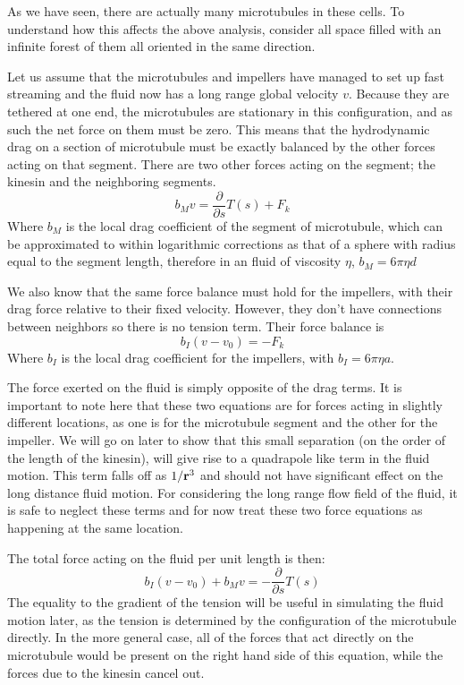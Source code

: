 \documentclass[11pt]{ucthesis}
\def\br{{\bf r}}
\begin{document}
As we have seen, there are actually many microtubules in these cells. To understand how this
affects the above analysis, consider all space filled with an infinite forest of them all oriented
in the same direction. 

Let us assume that the microtubules and impellers have managed to set up fast streaming and the fluid now has a long range global velocity $v$.
Because they are tethered at one end, the microtubules are stationary in this configuration, and as such the net force on them must be zero. 
This means that the hydrodynamic drag on a section of microtubule must be exactly balanced by the other forces acting on that segment.
There are two other forces acting on the segment; the kinesin and the neighboring segments.
\begin{equation}
\label{eq:mfnetMforce}
b_M v = \frac{\partial}{\partial s}T(s) + F_k
\end{equation}
Where $b_M$ is the local drag coefficient of the segment of microtubule, which can be approximated to within logarithmic corrections as that of a sphere with radius equal to the segment length, therefore in an fluid of viscosity $\eta$, $b_M = 6\pi \eta d$

We also know that the same force balance must hold for the impellers, with their drag force relative to their fixed velocity. 
However, they don't have connections between neighbors so there is no tension term. 
Their force balance is 
\begin{equation}
\label{eq:mfnetIforce}
b_I (v - v_0) =  -F_k
\end{equation}
Where $b_I$ is the local drag coefficient for the impellers, with $b_I = 6\pi\eta a$.

The force exerted on the fluid is simply opposite of the drag terms. It is important to note here that these two equations are for forces acting in slightly different locations, as one is for the microtubule segment and the other for the impeller. 
We will go on later to show that this small separation (on the order of the length of the kinesin), will give rise to a quadrapole like term in the fluid motion.
This term falls off as $1/\br^3$ and should not have significant effect on the long distance fluid motion.
For considering the long range flow field of the fluid, it is safe to neglect these terms and for now treat these two force equations as happening at the same location.

The total force acting on the fluid per unit length is then:
\begin{equation}
\label{eq:mfnetFforce}
b_I (v - v_0) + b_M v = -\frac{\partial}{\partial s}T(s)
\end{equation}
The equality to the gradient of the tension will be useful in simulating the fluid motion later, as the tension is determined by the configuration of the microtubule directly. 
In the more general case, all of the forces that act directly on the microtubule would be present on the right hand side of this equation, while the forces due to the kinesin cancel out.
\end{document}
